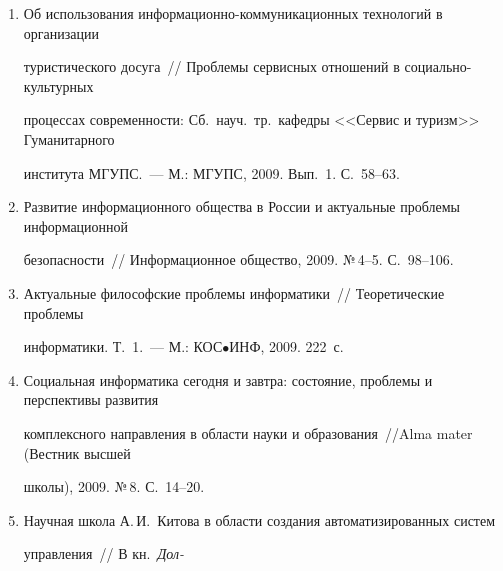 \begin{enumerate}[1.]
\item {}


Об использования ин\-фор\-ма\-ци\-он\-но-ком\-му\-ни\-ка\-ци\-он\-ных технологий в организации 


туристического досуга~// Проблемы сервисных отношений в со\-ци\-аль\-но-куль\-тур\-ных 


процессах современности: Сб.\ науч.\ тр.\ кафедры <<Сервис и туризм>> Гуманитарного 


института МГУПС.~--- М.: МГУПС, 2009. Вып.~1. С.~58--63.





\item {}


Развитие информационного общества в России и актуальные проблемы информационной 


безопасности~// Информационное общество, 2009. №\,4--5. С.~98--106.





\item {}


Актуальные философские проблемы информатики~// Теоретические проблемы 


информатики. Т.~1.~--- М.: КОС$\bullet$ИНФ, 2009. 222~с.





\item {}


Социальная информатика сегодня и завтра: состояние, проблемы и перспективы развития 


комплексного направления в области науки и образования~//Alma mater (Вестник высшей 


школы), 2009. №\,8. С.~14--20.





\item {}


Научная школа А.\,И.~Китова в области создания автоматизированных систем 


управления~// В кн.\ \textit{Дол-}\linebreak\vspace*{-12pt}


\pagebreak





\noindent



\end{enumerate}
